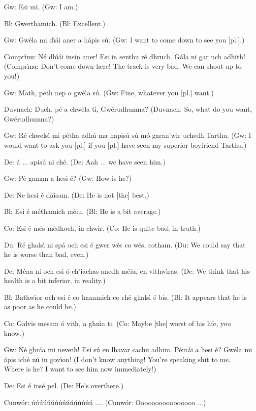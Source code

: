 Gw: Esi mi.
(Gw: I am.)

Bl: Gwerthamich.
(Bl: Excellent.)

Gw: Gw\'{e}la mi d\'{\i}\'{a}i aner a h\'{a}pis s\'{u}.
(Gw: I want to come down to see you [pl.].)

Compr\'{\i}nu: N\'{e} dh\'{\i}\'{a}i insin aner! Esi in senthu r\'{e} dhruch. G\'{a}la ni gar uch adhith!
(Compr\'{\i}nu: Don't come down here! The track is very bad. We can shout up to you!)

Gw: Math, peth nep o gw\'{e}la s\'{u}.
(Gw: Fine, whatever you [pl.] want.)

Duvnach: Duch, p\'{e} a chw\'{e}la ti, Gw\'{e}rudhumna?
(Duvnach: So, what do you want, Gw\'{e}rudhumna?)

Gw: R\'{e} chwels\'{\i} mi p\'{e}tha adh\'{u} ma hapis\'{u} s\'{u} m\'{o} garan’wir uchedh Tarthu.
(Gw: I would want to ask you [pl.] if you [pl.] have seen my superior boyfriend Tarthu.)

De: \'{a} ... apis\'{u} ni ch\'{e}.
(De: Aah ... we have seen him.)

Gw: P\'{e} gaman a hesi \'{e}?
(Gw: How is he?)

De: Ne hesi \'{e} d\'{a}isam.
(De: He is not [the] best.)

Bl: Esi \'{e} m\'{e}thamich m\'{e}iu.
(Bl: He is a bit average.)

Co: Esi \'{e} m\'{e}s m\'{e}dhoch, in chw\'{\i}r.
(Co: He is quite bad, in truth.)

Du: R\'{e} ghals\'{\i} ni sp\'{a} och esi \'{e} gwer w\'{e}s co w\'{e}s, cotham.
(Du: We could say that he is worse than bad, even.)

De: M\'{e}na ni och esi \'{o} ch’iachas anedh m\'{e}iu, en vithw\'{\i}ras.
(De: We think that his health is a bit inferior, in reality.)

Bl: Bathw\'{\i}or och esi \'{e} co hanamich co rh\'{e} ghals\'{\i} \'{e} bis.
(Bl: It appears that he is as poor as he could be.)

Co: Galvis mesam \'{o} vith, a ghn\'{\i}a ti.
(Co: Maybe [the] worst of his life, you know.)

Gw: N\'{e} ghn\'{\i}a mi neveth! Esi s\'{u} en lhavar cachu adhim. P\'{e}m\'{a}i a hesi \'{e}? Gw\'{e}la mi \'{a}pis ich\'{e} n\'{u} in gov\'{\i}on!
(I don't know anything! You’re speaking shit to me. Where is he? I want to see him now immediately!)

De: Esi \'{e} ins\'{e} pel.
(De: He’s overthere.)

Cunw\'{o}r: \'{u}\'{u}\'{u}\'{u}\'{u}\'{u}\'{u}\'{u}\'{u}\'{u}\'{u}\'{u}\'{u}\'{u}\'{u}\'{u} ....
(Cunw\'{o}r: Oooooooooooooooo ...)



